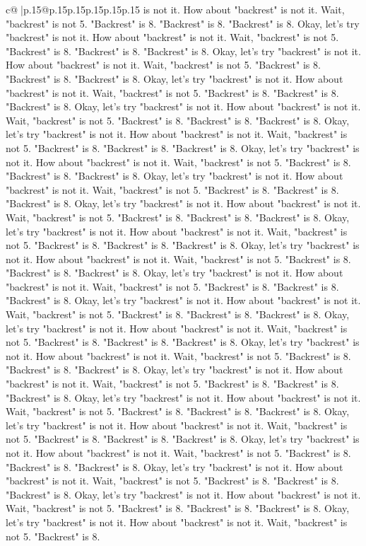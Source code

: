 \documentclass{article}
\begin{document}
{\begin{supertabular}{c@{$\;$}|p{.15\linewidth}@{}p{.15\linewidth}p{.15\linewidth}p{.15\linewidth}p{.15\linewidth}p{.15\linewidth}}
{{{is not it. How about "backrest" is not it. Wait, "backrest" is not 5. "Backrest" is 8. "Backrest" is 8. "Backrest" is 8. Okay, let's try "backrest" is not it. How about "backrest" is not it. Wait, "backrest" is not 5. "Backrest" is 8. "Backrest" is 8. "Backrest" is 8. Okay, let's try "backrest" is not it. How about "backrest" is not it. Wait, "backrest" is not 5. "Backrest" is 8. "Backrest" is 8. "Backrest" is 8. Okay, let's try "backrest" is not it. How about "backrest" is not it. Wait, "backrest" is not 5. "Backrest" is 8. "Backrest" is 8. "Backrest" is 8. Okay, let's try "backrest" is not it. How about "backrest" is not it. Wait, "backrest" is not 5. "Backrest" is 8. "Backrest" is 8. "Backrest" is 8. Okay, let's try "backrest" is not it. How about "backrest" is not it. Wait, "backrest" is not 5. "Backrest" is 8. "Backrest" is 8. "Backrest" is 8. Okay, let's try "backrest" is not it. How about "backrest" is not it. Wait, "backrest" is not 5. "Backrest" is 8. "Backrest" is 8. "Backrest" is 8. Okay, let's try "backrest" is not it. How about "backrest" is not it. Wait, "backrest" is not 5. "Backrest" is 8. "Backrest" is 8. "Backrest" is 8. Okay, let's try "backrest" is not it. How about "backrest" is not it. Wait, "backrest" is not 5. "Backrest" is 8. "Backrest" is 8. "Backrest" is 8. Okay, let's try "backrest" is not it. How about "backrest" is not it. Wait, "backrest" is not 5. "Backrest" is 8. "Backrest" is 8. "Backrest" is 8. Okay, let's try "backrest" is not it. How about "backrest" is not it. Wait, "backrest" is not 5. "Backrest" is 8. "Backrest" is 8. "Backrest" is 8. Okay, let's try "backrest" is not it. How about "backrest" is not it. Wait, "backrest" is not 5. "Backrest" is 8. "Backrest" is 8. "Backrest" is 8. Okay, let's try "backrest" is not it. How about "backrest" is not it. Wait, "backrest" is not 5. "Backrest" is 8. "Backrest" is 8. "Backrest" is 8. Okay, let's try "backrest" is not it. How about "backrest" is not it. Wait, "backrest" is not 5. "Backrest" is 8. "Backrest" is 8. "Backrest" is 8. Okay, let's try "backrest" is not it. How about "backrest" is not it. Wait, "backrest" is not 5. "Backrest" is 8. "Backrest" is 8. "Backrest" is 8. Okay, let's try "backrest" is not it. How about "backrest" is not it. Wait, "backrest" is not 5. "Backrest" is 8. "Backrest" is 8. "Backrest" is 8. Okay, let's try "backrest" is not it. How about "backrest" is not it. Wait, "backrest" is not 5. "Backrest" is 8. "Backrest" is 8. "Backrest" is 8. Okay, let's try "backrest" is not it. How about "backrest" is not it. Wait, "backrest" is not 5. "Backrest" is 8. "Backrest" is 8. "Backrest" is 8. Okay, let's try "backrest" is not it. How about "backrest" is not it. Wait, "backrest" is not 5. "Backrest" is 8. "Backrest" is 8. "Backrest" is 8. Okay, let's try "backrest" is not it. How about "backrest" is not it. Wait, "backrest" is not 5. "Backrest" is 8. "Backrest" is 8. "Backrest" is 8. Okay, let's try "backrest" is not it. How about "backrest" is not it. Wait, "backrest" is not 5. "Backrest" is 8. "Backrest" is 8. "Backrest" is 8. Okay, let's try "backrest" is not it. How about "backrest" is not it. Wait, "backrest" is not 5. "Backrest" is 8. }}}
\end{supertabular}}
\end{document}

